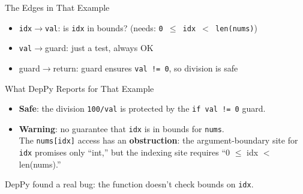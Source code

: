 \documentclass[aspectratio=169,10pt]{beamer}
\begin{document}
\begin{frame}{The Edges in That Example}
\begin{center}
\end{center}
\vspace{0.3em}
\begin{itemize}
  \item \texttt{idx}$\to$\texttt{val}: is \texttt{idx} in bounds? (needs: \texttt{0 $\le$ idx $<$ len(nums)})
  \item \texttt{val}$\to$guard: just a test, always OK
  \item guard$\to$return: guard ensures \texttt{val != 0}, so division is \textcolor{safe}{safe}
\end{itemize}
\end{frame}

\begin{frame}{What DepPy Reports for That Example}
\begin{itemize}
  \item \textcolor{safe}{\textbf{Safe}}: the division \texttt{100/val} is protected by the \texttt{if val != 0} guard.
  \item \textcolor{danger}{\textbf{Warning}}: no guarantee that \texttt{idx} is in bounds for \texttt{nums}.\\
    The \texttt{nums[idx]} access has an \textbf{obstruction}: the argument-boundary site for \texttt{idx} promises only ``int,'' but the indexing site requires ``0 $\le$ idx $<$ len(nums).''
\end{itemize}
\vspace{0.3em}
DepPy found a real bug: the function doesn't check bounds on \texttt{idx}.
\end{frame}
\end{document}
